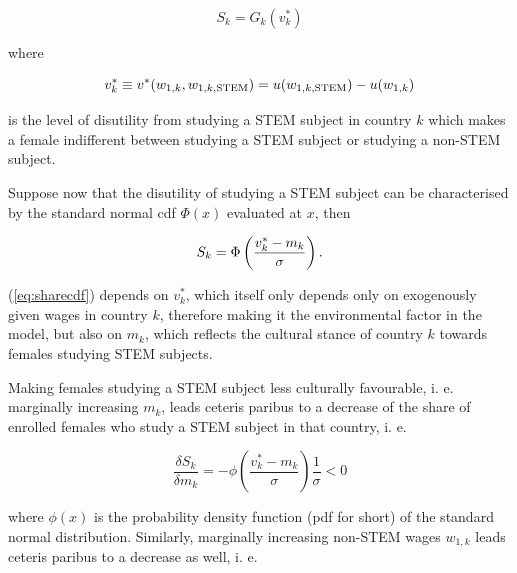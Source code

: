 \documentclass[a4paper, oneside, hyperfootnotes = false]{article}
\begin{document}
{\begin{equation}
	\label{eq:share}
	S_{k} = G_{k}(v^{*}_{k})
\end{equation}

\noindent where

\vspace{-8mm}

\begin{equation*}
	\label{eq:indiff}
	v^{*}_{k} \equiv v^{*}(w_{1,k}, w_{1,k,\textnormal{STEM}}) = u(w_{1,k,\textnormal{STEM}}) - u(w_{1,k})
\end{equation*}

\noindent is the level of disutility from studying a STEM subject in country $k$ which makes a female indifferent between studying a STEM subject or studying a non-STEM subject.

Suppose now that the disutility of studying a STEM subject can be characterised by the standard normal cdf $\Phi{}(x)$ evaluated at $x$, then

\vspace{-8mm}

\begin{equation}
	\label{eq:sharecdf}
	S_{k} = \Phi\left(\frac{v^{*}_{k} - m_{k}}{\sigma}\right)\textnormal{.}
\end{equation}

\noindent (\ref{eq:sharecdf}) depends on $v^{*}_{k}$, which itself only depends only on exogenously given wages in country $k$, therefore making it the environmental factor in the model, but also on $m_{k}$, which reflects the cultural stance of country $k$ towards females studying STEM subjects.

Making females studying a STEM subject less culturally favourable, i. e. marginally increasing $m_{k}$, leads ceteris paribus to a decrease of the share of enrolled females who study a STEM subject in that country, i. e.

\vspace{-8mm}

\begin{equation*}
	\label{eq:derivmk}
	\frac{\delta{}S_{k}}{\delta{}m_{k}} = -\phi\left(\frac{v^{*}_{k} - m_{k}}{\sigma}\right)\frac{1}{\sigma} < 0
\end{equation*}

\noindent where $\phi(x)$ is the probability density function (pdf for short) of the standard normal distribution. Similarly, marginally increasing non-STEM wages $w_{1,k}$ leads ceteris paribus to a decrease as well, i. e.

}
\end{document}
